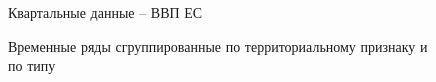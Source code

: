 \documentclass[12pt,a4paper, oneside]{extreport}
\begin{document}
\begin{figure}[H]
	\caption{Временные ряды сгруппированные по территориальному признаку и  по типу }
	\label{qwe}
	
	\centering\footnotesize{Квартальные данные -- ВВП ЕС  }
	
	\begin{minipage}[H]{0.4\linewidth}
	\end{minipage}
	\begin{minipage}[H]{0.4\linewidth}
	\end{minipage}
	

\end{figure}
\end{document}
